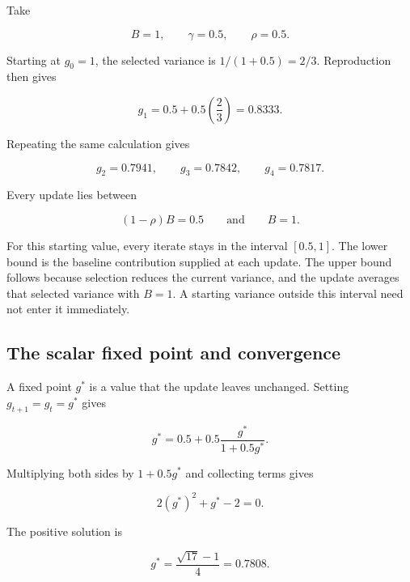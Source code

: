 \documentclass[11pt]{article}
\begin{document}
Take

\begin{equation}
B=1,\qquad \gamma=0.5,\qquad \rho=0.5.
\end{equation}

Starting at $g_0=1$, the selected variance is $1/(1+0.5)=2/3$.  Reproduction
then gives

\begin{equation}
g_1=0.5+0.5\left(\frac23\right)=0.8333.
\end{equation}

Repeating the same calculation gives

\begin{equation}
g_2=0.7941,\qquad g_3=0.7842,\qquad g_4=0.7817.
\end{equation}

Every update lies between

\begin{equation}
(1-\rho)B=0.5\qquad\text{and}\qquad B=1.
\label{eq:guide-scalar-bounds}
\end{equation}

For this starting value, every iterate stays in the interval $[0.5,1]$. The lower bound is the baseline contribution supplied at each update. The upper bound follows because selection reduces the current variance, and the update averages that selected variance with $B=1$. A starting variance outside this interval need not enter it immediately.

\subsection{The scalar fixed point and convergence}

A fixed point $g^*$ is a value that the update leaves unchanged.  Setting
$g_{t+1}=g_t=g^*$ gives

\begin{equation}
g^*=0.5+0.5\frac{g^*}{1+0.5g^*}.
\end{equation}

Multiplying both sides by $1+0.5g^*$ and collecting terms gives

\begin{equation}
2(g^*)^2+g^*-2=0.
\end{equation}

The positive solution is

\begin{equation}
g^*=\frac{\sqrt{17}-1}{4}=0.7808.
\end{equation}
\end{document}
